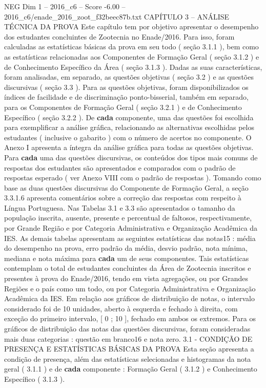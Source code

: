 \begin{textsample}{NEG Dim 1 – 2016\_c6 – Score -6.00 – 2016\_c6/enade\_2016\_zoot\_f32beec87b.txt}  \label{ex:f1_neg_046}
CAPÍTULO 3 – ANÁLISE TÉCNICA DA PROVA Este capítulo tem por objetivo apresentar o desempenho dos estudantes concluintes de Zootecnia no Enade/2016.
Para isso, foram calculadas as estatísticas básicas da prova em seu todo ( seção 3.1.1 ), bem como as estatísticas relacionadas aos Componentes de Formação Geral ( seção 3.1.2 ) e de Conhecimento Específico da Área ( seção 3.1.3 ).
Dadas as suas características, foram analisadas, em separado, as questões objetivas ( seção 3.2 ) e as questões discursivas ( seção 3.3 ).
Para as questões objetivas, foram disponibilizados os índices de facilidade e de discriminação ponto-bisserial, também em separado, para os Componentes de Formação Geral ( seção 3.2.1 ) e de Conhecimento Específico ( seção 3.2.2 ).
De \textbf{cada} componente, uma das questões foi escolhida para exemplificar a análise gráfica, relacionando as alternativas escolhidas pelos estudantes ( inclusive o gabarito ) com o número de acertos no componente.
O Anexo I apresenta a íntegra da análise gráfica para todas as questões objetivas.
Para \textbf{cada} uma das questões discursivas, os conteúdos dos tipos mais comuns de respostas dos estudantes são apresentados e comparados com o padrão de respostas esperado ( ver Anexo VIII com o padrão de respostas ).
Tomando como base as duas questões discursivas do Componente de Formação Geral, a seção 3.3.1.6 apresenta comentários sobre a correção das respostas com respeito à Língua Portuguesa.
Nas Tabelas 3.1 e 3.3 são apresentados o tamanho da população inscrita, ausente, presente e percentual de faltosos, respectivamente, por Grande Região e por Categoria Administrativa e Organização Acadêmica da IES.
As demais tabelas apresentam as seguintes estatísticas das notas15 : média do desempenho na prova, erro padrão da média, desvio padrão, nota mínima, mediana e nota máxima para \textbf{cada} um de seus componentes.
Tais estatísticas contemplam o total de estudantes concluintes da Área de Zootecnia inscritos e presentes à prova do Enade/2016, tendo em vista agregações, ou por Grandes Regiões e o país como um todo, ou por Categoria Administrativa e Organização Acadêmica da IES.
Em relação aos gráficos de distribuição de notas, o intervalo considerado foi de 10 unidades, aberto à esquerda e fechado à direita, com exceção do primeiro intervalo, [ 0 ; 10 ], fechado em ambos os extremos.
Para os gráficos de distribuição das notas das questões discursivas, foram consideradas mais duas categorias : questão em branco16 e nota zero. 3.1 - CONDIÇÃO DE PRESENÇA E ESTATÍSTICAS BÁSICAS DA PROVA Esta seção apresenta a condição de presença, além das estatísticas selecionadas e histogramas da nota geral ( 3.1.1 ) e de \textbf{cada} componente : Formação Geral ( 3.1.2 ) e Conhecimento Específico ( 3.1.3 ).

\end{textsample}
